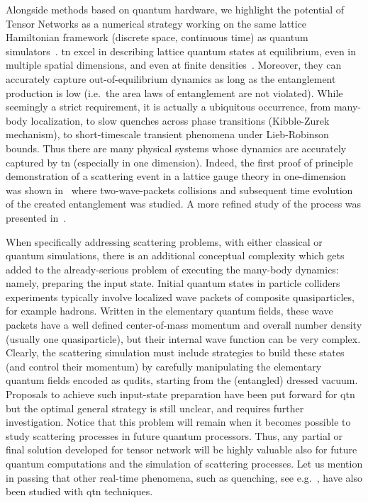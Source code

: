 Alongside methods based on quantum hardware, we highlight the potential of Tensor Networks as a numerical strategy working on the same lattice Hamiltonian framework (discrete space, continuous time) as quantum simulators~\cite{Schollwock2011,Montangero2018a, Silvi2019a,Cirac2020}. \gls{tn} excel in describing lattice quantum states at equilibrium, even in multiple spatial dimensions, and even at finite densities~\cite{Dalmonte2016,Banuls2020TNreview,Felser2019,Magnifico2020}. Moreover, they can accurately capture out-of-equilibrium dynamics as long as the entanglement production is low (i.e.~the area laws of entanglement are not violated). While seemingly a strict requirement, it is actually a ubiquitous occurrence, from many-body localization, to slow quenches across phase transitions (Kibble-Zurek mechanism), to short-timescale transient phenomena under Lieb-Robinson bounds. Thus there are many physical systems whose dynamics are accurately captured by \gls{tn} (especially in one dimension).
Indeed, the first proof of principle demonstration of a scattering event in a lattice gauge theory in one-dimension was shown in~\cite{Pichler2016} where two-wave-packets collisions and subsequent time evolution of the created entanglement was studied. A more refined study of the process was presented in~\cite{Rigobello2021}. 

When specifically addressing scattering problems, with either classical or quantum simulations, there is an additional conceptual complexity which gets added to the already-serious problem of executing the many-body dynamics: namely, preparing the input state. Initial quantum states in particle colliders experiments typically involve localized wave packets of composite quasiparticles, for example hadrons. Written in the elementary quantum fields, these wave packets have a well defined center-of-mass momentum and overall number density (usually one quasiparticle), but their internal wave function can be very complex. Clearly, the scattering simulation must include strategies to build these states (and control their momentum) by carefully manipulating the elementary quantum fields encoded as qudits, starting from the (entangled) dressed vacuum.
Proposals to achieve such input-state preparation have been put forward for \gls{qtn}~\cite{VanDamme21,dborin2022} but the optimal general strategy is still unclear, and requires further investigation. Notice that this problem will remain when it becomes possible to study scattering processes in future quantum processors. Thus, any partial or final solution developed for tensor network will be highly valuable also for future quantum computations and the simulation of scattering processes. 
Let us mention in passing that other real-time phenomena, such as quenching, see e.g.~\cite{Banuls:2022iwk,Banuls2019b}, have also been studied with \gls{qtn} techniques. 

